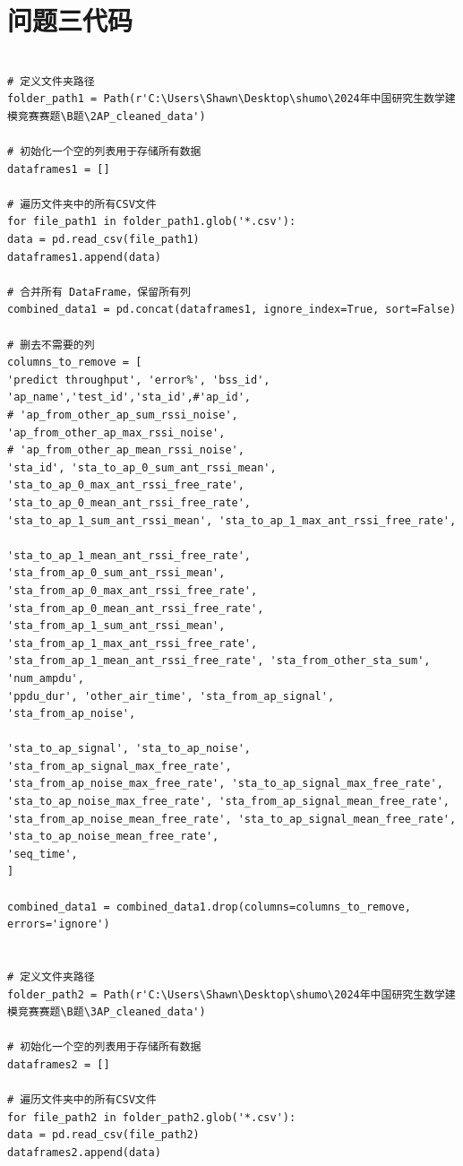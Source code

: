 \documentclass[bwprint]{gmcmthesis}
\begin{document}
\section{问题三代码}


\begin{lstlisting}
	
# 定义文件夹路径
folder_path1 = Path(r'C:\Users\Shawn\Desktop\shumo\2024年中国研究生数学建模竞赛赛题\B题\2AP_cleaned_data')

# 初始化一个空的列表用于存储所有数据
dataframes1 = []

# 遍历文件夹中的所有CSV文件
for file_path1 in folder_path1.glob('*.csv'):
data = pd.read_csv(file_path1)
dataframes1.append(data)

# 合并所有 DataFrame，保留所有列
combined_data1 = pd.concat(dataframes1, ignore_index=True, sort=False)

# 删去不需要的列
columns_to_remove = [
'predict throughput', 'error%', 'bss_id', 'ap_name','test_id','sta_id',#'ap_id',
# 'ap_from_other_ap_sum_rssi_noise', 'ap_from_other_ap_max_rssi_noise',
# 'ap_from_other_ap_mean_rssi_noise', 
'sta_id', 'sta_to_ap_0_sum_ant_rssi_mean',
'sta_to_ap_0_max_ant_rssi_free_rate', 'sta_to_ap_0_mean_ant_rssi_free_rate',
'sta_to_ap_1_sum_ant_rssi_mean', 'sta_to_ap_1_max_ant_rssi_free_rate',

'sta_to_ap_1_mean_ant_rssi_free_rate', 'sta_from_ap_0_sum_ant_rssi_mean',
'sta_from_ap_0_max_ant_rssi_free_rate', 'sta_from_ap_0_mean_ant_rssi_free_rate',
'sta_from_ap_1_sum_ant_rssi_mean', 'sta_from_ap_1_max_ant_rssi_free_rate',
'sta_from_ap_1_mean_ant_rssi_free_rate', 'sta_from_other_sta_sum', 'num_ampdu',
'ppdu_dur', 'other_air_time', 'sta_from_ap_signal', 'sta_from_ap_noise',

'sta_to_ap_signal', 'sta_to_ap_noise', 'sta_from_ap_signal_max_free_rate',
'sta_from_ap_noise_max_free_rate', 'sta_to_ap_signal_max_free_rate',
'sta_to_ap_noise_max_free_rate', 'sta_from_ap_signal_mean_free_rate',
'sta_from_ap_noise_mean_free_rate', 'sta_to_ap_signal_mean_free_rate',
'sta_to_ap_noise_mean_free_rate',
'seq_time',
]

combined_data1 = combined_data1.drop(columns=columns_to_remove, errors='ignore')


# 定义文件夹路径
folder_path2 = Path(r'C:\Users\Shawn\Desktop\shumo\2024年中国研究生数学建模竞赛赛题\B题\3AP_cleaned_data')

# 初始化一个空的列表用于存储所有数据
dataframes2 = []

# 遍历文件夹中的所有CSV文件
for file_path2 in folder_path2.glob('*.csv'):
data = pd.read_csv(file_path2)
dataframes2.append(data)


\end{lstlisting}
\end{document}
